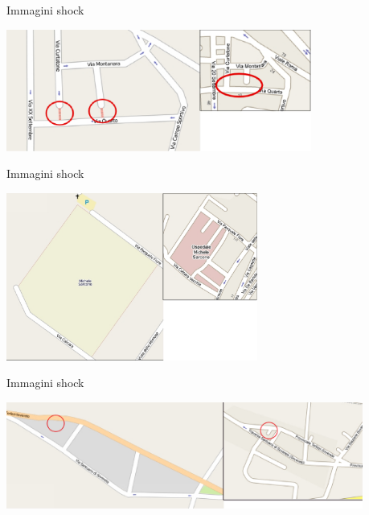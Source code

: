 \documentclass[slidestop,compress,red,notes,xcolor=dvipsnames]{beamer}	%
\begin{document}
        \begin{frame}{Immagini shock}
            \begin{center}
                \includegraphics[height=4cm]{images/mappe/montanara.eps}
            \end{center}
        \end{frame}

        \begin{frame}{Immagini shock}
            \begin{center}
                \includegraphics[height=5.5cm]{images/mappe/ospedale.eps}
            \end{center}
        \end{frame}

        \begin{frame}{Immagini shock}
            \begin{center}
                \includegraphics[height=3.5cm]{images/mappe/sovereto.eps}
            \end{center}
        \end{frame}
\end{document}

